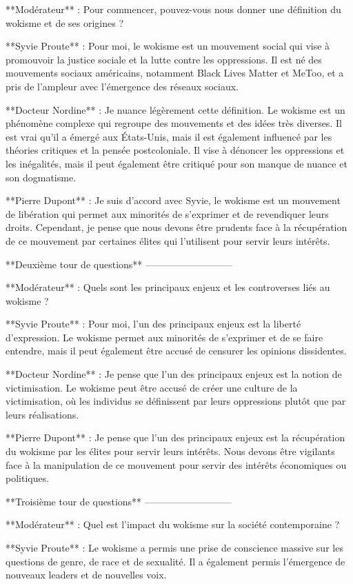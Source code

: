 **Modérateur** : Pour commencer, pouvez-vous nous donner une définition du wokisme et de ses origines ?

**Syvie Proute** : Pour moi, le wokisme est un mouvement social qui vise à promouvoir la justice sociale et la lutte contre les oppressions. Il est né des mouvements sociaux américains, notamment Black Lives Matter et MeToo, et a pris de l'ampleur avec l'émergence des réseaux sociaux.

**Docteur Nordine** : Je nuance légèrement cette définition. Le wokisme est un phénomène complexe qui regroupe des mouvements et des idées très diverses. Il est vrai qu'il a émergé aux États-Unis, mais il est également influencé par les théories critiques et la pensée postcoloniale. Il vise à dénoncer les oppressions et les inégalités, mais il peut également être critiqué pour son manque de nuance et son dogmatisme.

**Pierre Dupont** : Je suis d'accord avec Syvie, le wokisme est un mouvement de libération qui permet aux minorités de s'exprimer et de revendiquer leurs droits. Cependant, je pense que nous devons être prudents face à la récupération de ce mouvement par certaines élites qui l'utilisent pour servir leurs intérêts.

**Deuxième tour de questions**
---------------------------

**Modérateur** : Quels sont les principaux enjeux et les controverses liés au wokisme ?

**Syvie Proute** : Pour moi, l'un des principaux enjeux est la liberté d'expression. Le wokisme permet aux minorités de s'exprimer et de se faire entendre, mais il peut également être accusé de censurer les opinions dissidentes.

**Docteur Nordine** : Je pense que l'un des principaux enjeux est la notion de victimisation. Le wokisme peut être accusé de créer une culture de la victimisation, où les individus se définissent par leurs oppressions plutôt que par leurs réalisations.

**Pierre Dupont** : Je pense que l'un des principaux enjeux est la récupération du wokisme par les élites pour servir leurs intérêts. Nous devons être vigilants face à la manipulation de ce mouvement pour servir des intérêts économiques ou politiques.

**Troisième tour de questions**
---------------------------

**Modérateur** : Quel est l'impact du wokisme sur la société contemporaine ?

**Syvie Proute** : Le wokisme a permis une prise de conscience massive sur les questions de genre, de race et de sexualité. Il a également permis l'émergence de nouveaux leaders et de nouvelles voix.

